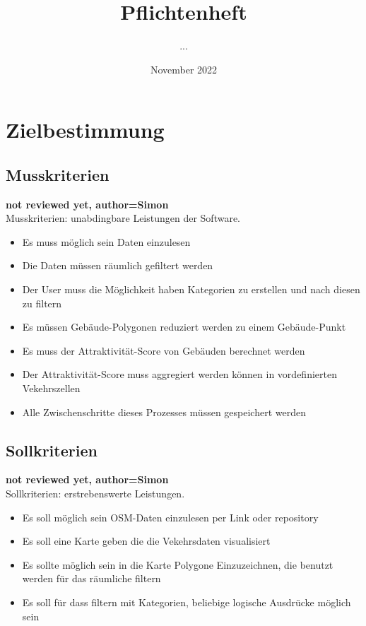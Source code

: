\documentclass[parskip=full]{scrartcl} %
\title{Pflichtenheft}
\author{...}
\date{November 2022}
\begin{document}
\maketitle
\newpage

\tableofcontents
\newpage




\section{Zielbestimmung}

\subsection{Musskriterien}
\textbf{not reviewed yet, author=Simon\\}
Musskriterien: unabdingbare Leistungen der Software.
\begin{itemize}
    \item Es muss möglich sein Daten einzulesen
    \item Die Daten müssen räumlich gefiltert werden
    \item Der User muss die Möglichkeit haben Kategorien zu erstellen und nach diesen zu filtern
    \item Es müssen Gebäude-Polygonen reduziert werden zu einem Gebäude-Punkt
    \item Es muss der Attraktivität-Score von Gebäuden berechnet werden
    \item Der Attraktivität-Score muss aggregiert werden können in vordefinierten Vekehrszellen
    \item Alle Zwischenschritte dieses Prozesses müssen gespeichert werden
\end{itemize}

\subsection{Sollkriterien}
\textbf{not reviewed yet, author=Simon\\}
Sollkriterien: erstrebenswerte Leistungen.
\begin{itemize}
    \item Es soll möglich sein OSM-Daten einzulesen per Link oder repository
    \item Es soll eine Karte geben die die Vekehrsdaten visualisiert 
    \item Es sollte möglich sein in die Karte Polygone Einzuzeichnen, die benutzt werden für das räumliche filtern
    \item Es soll für dass filtern mit Kategorien, beliebige logische Ausdrücke möglich sein
\end{itemize}
\end{document}
